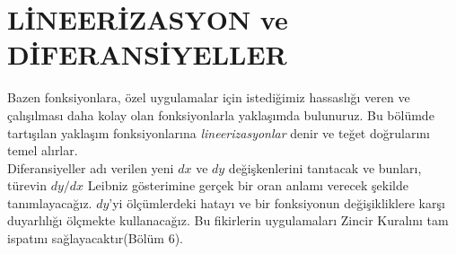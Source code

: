 \chapter{\protect LİNEERİZASYON ve DİFERANSİYELLER}
	Bazen fonksiyonlara, özel uygulamalar için istediğimiz hassaslığı veren ve çalışılması daha kolay olan fonksiyonlarla yaklaşımda bulunuruz. Bu bölümde tartışılan yaklaşım fonksiyonlarına \textit{lineerizasyonlar} denir ve teğet doğrularını temel alırlar.\\
Diferansiyeller adı verilen yeni $dx$ ve $dy$ değişkenlerini tanıtacak ve bunları, türevin $dy/dx$ Leibniz gösterimine gerçek bir oran anlamı verecek şekilde tanımlayacağız.  $dy$'yi ölçümlerdeki hatayı ve bir fonksiyonun değişikliklere karşı duyarlılığı ölçmekte kullanacağız. Bu fikirlerin uygulamaları Zincir Kuralını tam ispatını sağlayacaktır(Bölüm 6).

